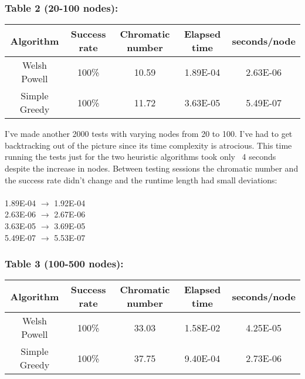 \documentclass[runningheads]{llncs}
\begin{document}
\subsubsection{Table 2 (20-100 nodes):}
\begin{center}
	\begin{tabular}{ |c|c|c|c|c| } 
		\hline
		Algorithm & Success rate & Chromatic number & Elapsed time & seconds/node \\
		\hline
		Welsh Powell & 100\% & 10.59 & 1.89E-04 & 2.63E-06 \\
		Simple Greedy & 100\% & 11.72 & 3.63E-05 & 5.49E-07 \\
		\hline
	\end{tabular}
\end{center}
\newpage
I've made another 2000 tests with varying nodes from 20 to 100. I've had to get backtracking
out of the picture since its time complexity is atrocious. This time running the tests
just for the two heuristic algorithms took only ~4 seconds despite the increase in nodes.
Between testing sessions the chromatic number and the success rate didn't change and
the runtime length had small deviations:
\\
\\
\textbullet \hspace{1pt} 1.89E-04 $\rightarrow$ 1.92E-04 \\
\textbullet \hspace{1pt} 2.63E-06 $\rightarrow$ 2.67E-06 \\
\textbullet \hspace{1pt} 3.63E-05 $\rightarrow$ 3.69E-05 \\
\textbullet \hspace{1pt} 5.49E-07 $\rightarrow$	 5.53E-07 \\

\subsubsection{Table 3 (100-500 nodes):}
\begin{center}
	\begin{tabular}{ |c|c|c|c|c| } 
		\hline
		Algorithm & Success rate & Chromatic number & Elapsed time & seconds/node \\
		\hline
		Welsh Powell & 100\% & 33.03 & 1.58E-02 & 4.25E-05 \\
		Simple Greedy & 100\% & 37.75 & 9.40E-04 & 2.73E-06 \\
		\hline
	\end{tabular}
\end{center}
\end{document}
